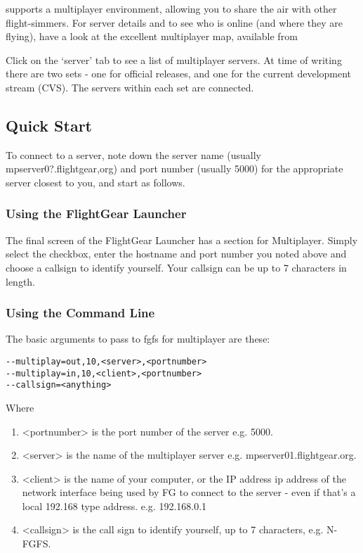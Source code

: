 \FlightGear{} supports a multiplayer environment, allowing you to share the air with other flight-simmers. 
For server details and to see who is online (and where they are flying), have a look at the excellent multiplayer map, available from

\noindent
{}

Click on the `server' tab to see a list of multiplayer servers. At time of writing there are two sets - one for official \FlightGear{} releases,
and one for the current development stream (CVS). The servers within each set are connected. 
\subsection{Quick Start}

To connect to a server, note down the server name (usually mpserver0?.flightgear,org) and port number (usually 5000) for the appropriate 
server
closest to you, and start \FlightGear{} as follows.

\subsubsection{Using the FlightGear Launcher}

The final screen of the FlightGear Launcher has a section for Multiplayer. Simply select the checkbox, enter the hostname and port 
number you noted above and choose a callsign to identify yourself. Your callsign can be up to 7 characters in length.

\subsubsection{Using the Command Line}

The basic arguments to pass to fgfs for multiplayer are these:

\begin{verbatim}
--multiplay=out,10,<server>,<portnumber>
--multiplay=in,10,<client>,<portnumber>
--callsign=<anything>
\end{verbatim}

Where 
\begin{enumerate}
\item <portnumber> is the port number of the server e.g. 5000.
\item <server> is the name of the multiplayer server e.g. mpserver01.flightgear.org.
\item <client> is the name of your computer, or the IP address ip address of the network interface being used by FG to connect to the server -
even if that's a local 192.168 type address. e.g. 192.168.0.1
\item <callsign> is the call sign to identify yourself, up to 7 characters, e.g. N-FGFS.
\end{enumerate}

